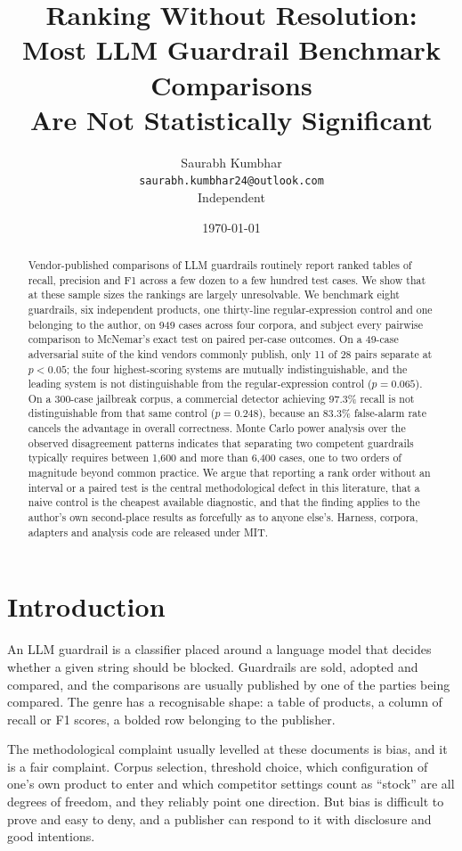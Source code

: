 \documentclass[11pt]{article}
\title{Ranking Without Resolution:\\
Most LLM Guardrail Benchmark Comparisons\\
Are Not Statistically Significant}
\author{
  Saurabh Kumbhar\\
  \texttt{saurabh.kumbhar24@outlook.com}\\
  \small Independent
}
\date{\today}
\begin{document}
\maketitle

\begin{abstract}
Vendor-published comparisons of LLM guardrails routinely report ranked tables of
recall, precision and F1 across a few dozen to a few hundred test cases. We show
that at these sample sizes the rankings are largely unresolvable. We benchmark
eight guardrails, six independent products, one thirty-line regular-expression
control and one belonging to the author, on 949 cases across four corpora, and
subject every pairwise comparison to McNemar's exact test on paired per-case
outcomes. On a 49-case adversarial suite of the kind vendors commonly publish,
only 11 of 28 pairs separate at $p < 0.05$; the four highest-scoring systems are
mutually indistinguishable, and the leading system is not distinguishable from
the regular-expression control ($p = 0.065$). On a 300-case jailbreak corpus, a
commercial detector achieving 97.3\% recall is not distinguishable from that same
control ($p = 0.248$), because an 83.3\% false-alarm rate cancels the advantage in
overall correctness. Monte Carlo power analysis over the observed disagreement
patterns indicates that separating two competent guardrails typically requires
between 1,600 and more than 6,400 cases, one to two orders of magnitude beyond
common practice. We argue that reporting a rank order without an interval or a
paired test is the central methodological defect in this literature, that a naive
control is the cheapest available diagnostic, and that the finding applies to the
author's own second-place results as forcefully as to anyone else's. Harness,
corpora, adapters and analysis code are released under MIT.
\end{abstract}

\section{Introduction}

An LLM guardrail is a classifier placed around a language model that decides
whether a given string should be blocked. Guardrails are sold, adopted and
compared, and the comparisons are usually published by one of the parties being
compared. The genre has a recognisable shape: a table of products, a column of
recall or F1 scores, a bolded row belonging to the publisher.

The methodological complaint usually levelled at these documents is bias, and it
is a fair complaint. Corpus selection, threshold choice, which configuration of
one's own product to enter and which competitor settings count as ``stock'' are
all degrees of freedom, and they reliably point one direction. But bias is
difficult to prove and easy to deny, and a publisher can respond to it with
disclosure and good intentions.
\end{document}
